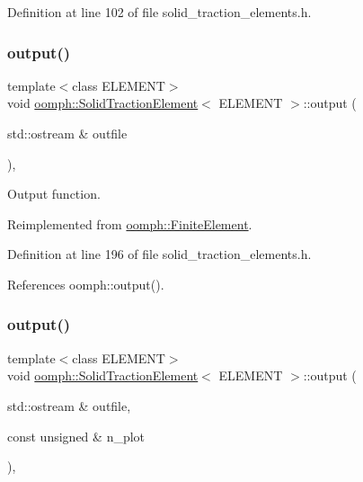 Definition at line 102 of file solid\+\_\+traction\+\_\+elements.\+h.

\mbox{\label{classoomph_1_1SolidTractionElement_aa5ae857f45de4fed26278e7919089a1d}} 
\subsubsection{\texorpdfstring{output()}{output()}\hspace{0.1cm}{\footnotesize\ttfamily [1/4]}}
{\footnotesize\ttfamily template$<$class E\+L\+E\+M\+E\+NT$>$ \\
void \hyperlink{classoomph_1_1SolidTractionElement}{oomph\+::\+Solid\+Traction\+Element}$<$ E\+L\+E\+M\+E\+NT $>$\+::output (\begin{DoxyParamCaption}\item[{std\+::ostream \&}]{outfile }\end{DoxyParamCaption})\hspace{0.3cm}{\ttfamily [inline]}, {\ttfamily [virtual]}}



Output function. 



Reimplemented from \hyperlink{classoomph_1_1FiniteElement_a2ad98a3d2ef4999f1bef62c0ff13f2a7}{oomph\+::\+Finite\+Element}.



Definition at line 196 of file solid\+\_\+traction\+\_\+elements.\+h.



References oomph\+::output().

\mbox{\label{classoomph_1_1SolidTractionElement_a13a5bbe49c2d7ad5079e3354a34f248e}} 
\subsubsection{\texorpdfstring{output()}{output()}\hspace{0.1cm}{\footnotesize\ttfamily [2/4]}}
{\footnotesize\ttfamily template$<$class E\+L\+E\+M\+E\+NT$>$ \\
void \hyperlink{classoomph_1_1SolidTractionElement}{oomph\+::\+Solid\+Traction\+Element}$<$ E\+L\+E\+M\+E\+NT $>$\+::output (\begin{DoxyParamCaption}\item[{std\+::ostream \&}]{outfile,  }\item[{const unsigned \&}]{n\+\_\+plot }\end{DoxyParamCaption})\hspace{0.3cm}{\ttfamily [inline]}, {\ttfamily [virtual]}}



